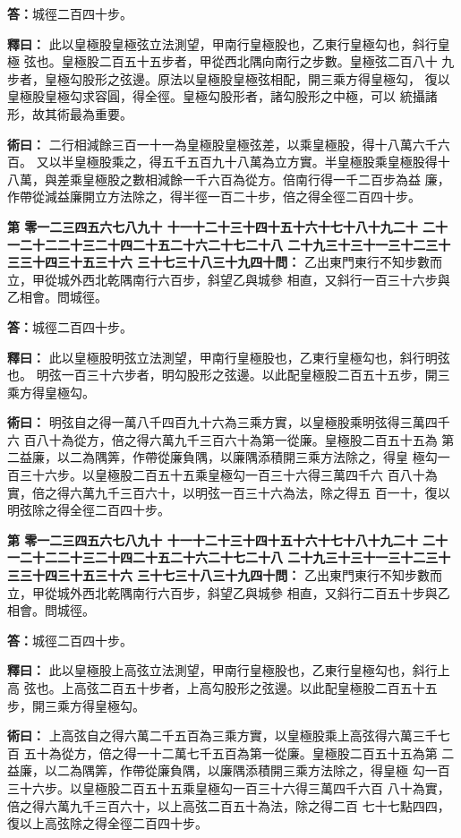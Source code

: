 \documentclass[11pt,a4paper]{article}
\newcounter{probnum}
\newcommand{\chnum}[1]{%
  \ifcase#1 零\or 一\or 二\or 三\or 四\or 五\or 六\or 七\or 八\or 九\or 十\or
    十一\or 十二\or 十三\or 十四\or 十五\or 十六\or 十七\or 十八\or 十九\or 二十\or
    二十一\or 二十二\or 二十三\or 二十四\or 二十五\or 二十六\or 二十七\or 二十八\or
    二十九\or 三十\or 三十一\or 三十二\or 三十三\or 三十四\or 三十五\or 三十六\or
    三十七\or 三十八\or 三十九\or 四十\fi}
\newcommand{\problem}[1]{\stepcounter{probnum}\par\noindent\textbf{第\chnum{\value{probnum}}問：}#1\par}
\newcommand{\answer}[1]{\par\noindent\textbf{答：}#1\par}
\newcommand{\shiyi}[1]{\par\noindent\textbf{釋曰：}#1\par}
\newcommand{\shuyue}[1]{\par\noindent\textbf{術曰：}#1\par}
\begin{document}
\answer{城徑二百四十步。}

\shiyi{
此以皇極股皇極弦立法測望，甲南行皇極股也，乙東行皇極勾也，斜行皇極
弦也。皇極股二百五十五步者，甲從西北隅向南行之步數。皇極弦二百八十
九步者，皇極勾股形之弦邊。原法以皇極股皇極弦相配，開三乘方得皇極勾，
復以皇極股皇極勾求容圓，得全徑。皇極勾股形者，諸勾股形之中極，可以
統攝諸形，故其術最為重要。
}

\shuyue{
二行相減餘三百一十一為皇極股皇極弦差，以乘皇極股，得十八萬六千六百。
又以半皇極股乘之，得五千五百九十八萬為立方實。半皇極股乘皇極股得十
八萬，與差乘皇極股之數相減餘一千六百為從方。倍南行得一千二百步為益
廉，作帶從減益廉開立方法除之，得半徑一百二十步，倍之得全徑二百四十步。
}

\vspace{0.3cm}
\problem{
乙出東門東行不知步數而立，甲從城外西北乾隅南行六百步，斜望乙與城參
相直，又斜行一百三十六步與乙相會。問城徑。
}

\answer{城徑二百四十步。}

\shiyi{
此以皇極股明弦立法測望，甲南行皇極股也，乙東行皇極勾也，斜行明弦也。
明弦一百三十六步者，明勾股形之弦邊。以此配皇極股二百五十五步，開三
乘方得皇極勾。
}

\shuyue{
明弦自之得一萬八千四百九十六為三乘方實，以皇極股乘明弦得三萬四千六
百八十為從方，倍之得六萬九千三百六十為第一從廉。皇極股二百五十五為
第二益廉，以二為隅筭，作帶從廉負隅，以廉隅添積開三乘方法除之，得皇
極勾一百三十六步。以皇極股二百五十五乘皇極勾一百三十六得三萬四千六
百八十為實，倍之得六萬九千三百六十，以明弦一百三十六為法，除之得五
百一十，復以明弦除之得全徑二百四十步。
}

\vspace{0.3cm}
\problem{
乙出東門東行不知步數而立，甲從城外西北乾隅南行六百步，斜望乙與城參
相直，又斜行二百五十步與乙相會。問城徑。
}

\answer{城徑二百四十步。}

\shiyi{
此以皇極股上高弦立法測望，甲南行皇極股也，乙東行皇極勾也，斜行上高
弦也。上高弦二百五十步者，上高勾股形之弦邊。以此配皇極股二百五十五
步，開三乘方得皇極勾。
}

\shuyue{
上高弦自之得六萬二千五百為三乘方實，以皇極股乘上高弦得六萬三千七百
五十為從方，倍之得一十二萬七千五百為第一從廉。皇極股二百五十五為第
二益廉，以二為隅筭，作帶從廉負隅，以廉隅添積開三乘方法除之，得皇極
勾一百三十六步。以皇極股二百五十五乘皇極勾一百三十六得三萬四千六百
八十為實，倍之得六萬九千三百六十，以上高弦二百五十為法，除之得二百
七十七點四四，復以上高弦除之得全徑二百四十步。
}
\end{document}
